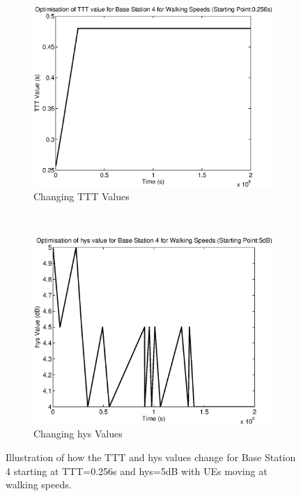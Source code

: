 \begin{figure}[H]
        \centering
        \begin{subfigure}[b]{0.49\textwidth}
                \includegraphics[width=\textwidth]{figures/graphs/walkmid/TTT4.eps}
                \caption{Changing TTT Values}
        \end{subfigure}%
        ~ %
        \begin{subfigure}[b]{0.49\textwidth}
                \includegraphics[width=\textwidth]{figures/graphs/walkmid/hys4.eps}
                \caption{Changing hys Values}
        \end{subfigure}
        \caption{Illustration of how the TTT and hys values change for Base Station 4 starting at TTT=0.256s and hys=5dB with UEs moving at walking speeds.}
\end{figure}
